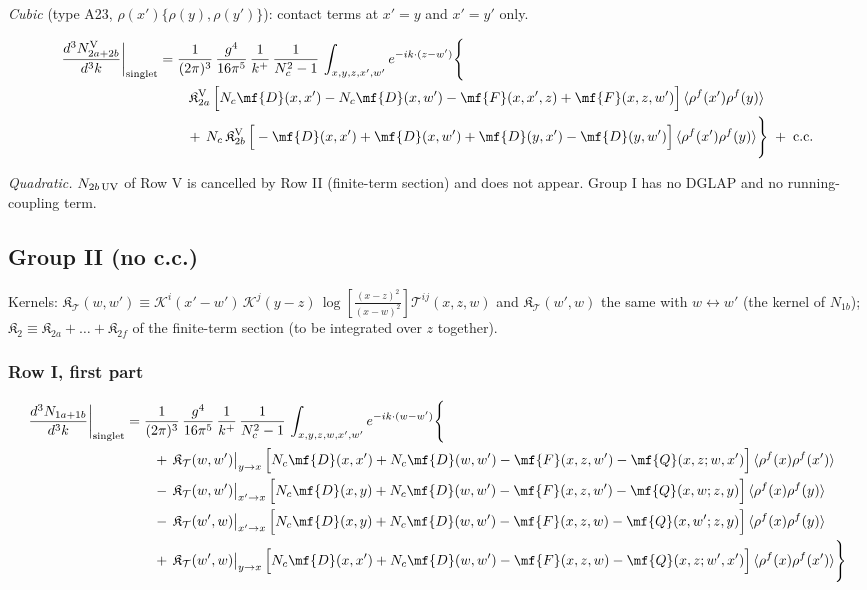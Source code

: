 \emph{Cubic} (type A23, $\rho(x')\{\rho(y),\rho(y')\}$): contact terms at $x'=y$ and $x'=y'$ only.

\begin{align}
\frac{d^{3}N_{2a+2b}^{\rm V}}{d^{3}k}\bigg|_{\rm singlet}&=\frac{1}{(2\pi)^{3}}\,\frac{g^{4}}{16\pi^{5}}\,\frac{1}{k^{+}}\,\frac{1}{N_{c}^{2}-1}\,\int_{x,y,z,x',w'}e^{-ik\cdot(z-w')}\Bigg\{\notag\\
&\qquad \,\mathfrak{K}^{\rm V}_{2a}\,\Big[N_{c}\mf{D}(x,x')-N_{c}\mf{D}(x,w')-\mf{F}(x,x',z)+\mf{F}(x,z,w')\Big]\,\langle\rho^{f}(x')\rho^{f}(y)\rangle\notag\\
&\qquad +\,N_{c}\,\mathfrak{K}^{\rm V}_{2b}\,\Big[-\mf{D}(x,x')+\mf{D}(x,w')+\mf{D}(y,x')-\mf{D}(y,w')\Big]\,\langle\rho^{f}(x')\rho^{f}(y)\rangle\Bigg\}\;+\;{\rm c.c.}\label{eq:s-I-V-2}
\end{align}

\emph{Quadratic.} $N_{2b\,\rm UV}$ of Row V is cancelled by Row II (finite-term section) and does not appear. Group I has no DGLAP and no running-coupling term.

\subsection{Group II (no c.c.)}
\noindent Kernels: $\mathfrak{K}_{\mathcal{T}}(w,w')\equiv\mathcal{K}^{i}(x'-w')\,\mathcal{K}^{j}(y-z)\,\log\left[\frac{(x-z)^{2}}{(x-w)^{2}}\right]\mathcal{T}^{ij}(x,z,w)$ and $\mathfrak{K}_{\mathcal{T}}(w',w)$ the same with $w\leftrightarrow w'$ (the kernel of $N_{1b}$); $\mathfrak{K}_{2}\equiv\mathfrak{K}_{2a}+\dots+\mathfrak{K}_{2f}$ of the finite-term section (to be integrated over $z$ together).
\subsubsection*{Row I, first part}

\begin{align}
\frac{d^{3}N_{1a+1b}}{d^{3}k}\bigg|_{\rm singlet}&=\frac{1}{(2\pi)^{3}}\,\frac{g^{4}}{16\pi^{5}}\,\frac{1}{k^{+}}\,\frac{1}{N_{c}^{2}-1}\,\int_{x,y,z,w,x',w'}e^{-ik\cdot(w-w')}\Bigg\{\notag\\
&\qquad +\,\mathfrak{K}_{\mathcal{T}}(w,w')\big|_{y\to x}\,\Big[N_{c}\mf{D}(x,x')+N_{c}\mf{D}(w,w')-\mf{F}(x,z,w')-\mf{Q}(x,z;w,x')\Big]\,\langle\rho^{f}(x)\rho^{f}(x')\rangle\notag\\
&\qquad -\,\mathfrak{K}_{\mathcal{T}}(w,w')\big|_{x'\to x}\,\Big[N_{c}\mf{D}(x,y)+N_{c}\mf{D}(w,w')-\mf{F}(x,z,w')-\mf{Q}(x,w;z,y)\Big]\,\langle\rho^{f}(x)\rho^{f}(y)\rangle\notag\\
&\qquad -\,\mathfrak{K}_{\mathcal{T}}(w',w)\big|_{x'\to x}\,\Big[N_{c}\mf{D}(x,y)+N_{c}\mf{D}(w,w')-\mf{F}(x,z,w)-\mf{Q}(x,w';z,y)\Big]\,\langle\rho^{f}(x)\rho^{f}(y)\rangle\notag\\
&\qquad +\,\mathfrak{K}_{\mathcal{T}}(w',w)\big|_{y\to x}\,\Big[N_{c}\mf{D}(x,x')+N_{c}\mf{D}(w,w')-\mf{F}(x,z,w)-\mf{Q}(x,z;w',x')\Big]\,\langle\rho^{f}(x)\rho^{f}(x')\rangle\Bigg\}\label{eq:s-II-I-1}
\end{align}

